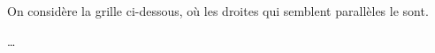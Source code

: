 \begin{exercice*}
    On considère la grille ci-dessous, où les droites qui semblent parallèles le sont.

\end{exercice*}
\begin{corrige}
\dots
\end{corrige}

